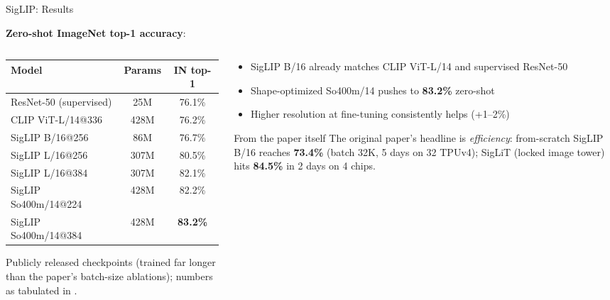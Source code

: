 \begin{frame}{SigLIP: Results}

  \textbf{Zero-shot ImageNet top-1 accuracy}:
  \vspace{0.2em}

  \begin{columns}
    \begin{column}{0.48\textwidth}
      \begin{center}
      \scriptsize
      \begin{tabular}{l c c}
        \toprule
        \textbf{Model} & \textbf{Params} & \textbf{IN top-1} \\
        \midrule
        ResNet-50 (supervised) & 25M & 76.1\% \\
        CLIP ViT-L/14@336 & 428M & 76.2\% \\
        \midrule
        SigLIP B/16@256 & 86M & 76.7\% \\
        SigLIP L/16@256 & 307M & 80.5\% \\
        SigLIP L/16@384 & 307M & 82.1\% \\
        SigLIP So400m/14@224 & 428M & 82.2\% \\
        SigLIP So400m/14@384 & 428M & \textbf{83.2\%} \\
        \bottomrule
      \end{tabular}
      \end{center}
      {\scriptsize Publicly released checkpoints (trained far longer than the paper's batch-size ablations); numbers as tabulated in \cite{tschannen2025siglip2}.}
    \end{column}
    \begin{column}{0.48\textwidth}
      \begin{itemize}
        \item SigLIP B/16 already matches CLIP ViT-L/14 and supervised ResNet-50
        \item Shape-optimized So400m/14 pushes to \textbf{83.2\%} zero-shot
        \item Higher resolution at fine-tuning consistently helps (+1--2\%)
      \end{itemize}

      \vspace{0.3em}
      \begin{block}{From the paper itself}
        \footnotesize
        The original paper's headline is \emph{efficiency}: from-scratch SigLIP B/16 reaches \textbf{73.4\%} (batch 32K, 5 days on 32 TPUv4); SigLiT (locked image tower) hits \textbf{84.5\%} in 2 days on 4 chips.
      \end{block}
    \end{column}
  \end{columns}
\end{frame}

